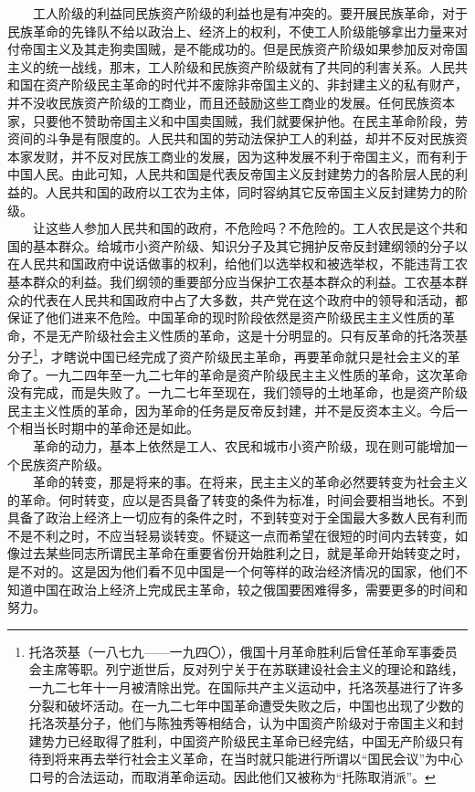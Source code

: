 \documentclass[cn,11pt,chinese]{elegantbook}
\begin{document}
　　工人阶级的利益同民族资产阶级的利益也是有冲突的。要开展民族革命，对于民族革命的先锋队不给以政治上、经济上的权利，不使工人阶级能够拿出力量来对付帝国主义及其走狗卖国贼，是不能成功的。但是民族资产阶级如果参加反对帝国主义的统一战线，那末，工人阶级和民族资产阶级就有了共同的利害关系。人民共和国在资产阶级民主革命的时代并不废除非帝国主义的、非封建主义的私有财产，并不没收民族资产阶级的工商业，而且还鼓励这些工商业的发展。任何民族资本家，只要他不赞助帝国主义和中国卖国贼，我们就要保护他。在民主革命阶段，劳资间的斗争是有限度的。人民共和国的劳动法保护工人的利益，却并不反对民族资本家发财，并不反对民族工商业的发展，因为这种发展不利于帝国主义，而有利于中国人民。由此可知，人民共和国是代表反帝国主义反封建势力的各阶层人民的利益的。人民共和国的政府以工农为主体，同时容纳其它反帝国主义反封建势力的阶级。\\
　　让这些人参加人民共和国的政府，不危险吗？不危险的。工人农民是这个共和国的基本群众。给城市小资产阶级、知识分子及其它拥护反帝反封建纲领的分子以在人民共和国政府中说话做事的权利，给他们以选举权和被选举权，不能违背工农基本群众的利益。我们纲领的重要部分应当保护工农基本群众的利益。工农基本群众的代表在人民共和国政府中占了大多数，共产党在这个政府中的领导和活动，都保证了他们进来不危险。中国革命的现时阶段依然是资产阶级民主主义性质的革命，不是无产阶级社会主义性质的革命，这是十分明显的。只有反革命的托洛茨基分子\footnote[33]{ 托洛茨基（一八七九——一九四〇），俄国十月革命胜利后曾任革命军事委员会主席等职。列宁逝世后，反对列宁关于在苏联建设社会主义的理论和路线，一九二七年十一月被清除出党。在国际共产主义运动中，托洛茨基进行了许多分裂和破坏活动。在一九二七年中国革命遭受失败之后，中国也出现了少数的托洛茨基分子，他们与陈独秀等相结合，认为中国资产阶级对于帝国主义和封建势力已经取得了胜利，中国资产阶级民主革命已经完结，中国无产阶级只有待到将来再去举行社会主义革命，在当时就只能进行所谓以“国民会议”为中心口号的合法运动，而取消革命运动。因此他们又被称为“托陈取消派”。}，才瞎说中国已经完成了资产阶级民主革命，再要革命就只是社会主义的革命了。一九二四年至一九二七年的革命是资产阶级民主主义性质的革命，这次革命没有完成，而是失败了。一九二七年至现在，我们领导的土地革命，也是资产阶级民主主义性质的革命，因为革命的任务是反帝反封建，并不是反资本主义。今后一个相当长时期中的革命还是如此。\\
　　革命的动力，基本上依然是工人、农民和城市小资产阶级，现在则可能增加一个民族资产阶级。\\
　　革命的转变，那是将来的事。在将来，民主主义的革命必然要转变为社会主义的革命。何时转变，应以是否具备了转变的条件为标准，时间会要相当地长。不到具备了政治上经济上一切应有的条件之时，不到转变对于全国最大多数人民有利而不是不利之时，不应当轻易谈转变。怀疑这一点而希望在很短的时间内去转变，如像过去某些同志所谓民主革命在重要省份开始胜利之日，就是革命开始转变之时，是不对的。这是因为他们看不见中国是一个何等样的政治经济情况的国家，他们不知道中国在政治上经济上完成民主革命，较之俄国要困难得多，需要更多的时间和努力。\\
\end{document}
